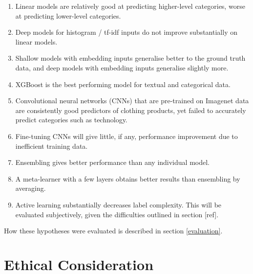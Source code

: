 \begin{enumerate}
  \item Linear models are relatively good at predicting higher-level categories, worse at predicting lower-level categories.
  \item Deep models for histogram / tf-idf inputs do not improve substantially on linear models.
  \item Shallow models with embedding inputs generalise better to the ground truth data, and deep models with embedding inputs generalise slightly more.
  \item XGBoost is the best performing model  for textual and categorical data.
  \item Convolutional  neural networks (CNNs) that are pre-trained on Imagenet data are consistently good predictors  of clothing products, yet failed to accurately predict categories such as technology.
  \item Fine-tuning CNNs  will give little, if any,  performance  improvement due to inefficient training data.
  \item Ensembling  gives better performance than any individual model.
  \item A meta-learner with a few layers  obtains better results than ensembling by averaging.
  \item Active learning substantially decreases label complexity.  This will be evaluated subjectively, given the  difficulties outlined in section [ref].
\end{enumerate}

\hfill \break
How these hypotheses were evaluated is described in section \ref{evaluation}.


\section{Ethical Consideration}

